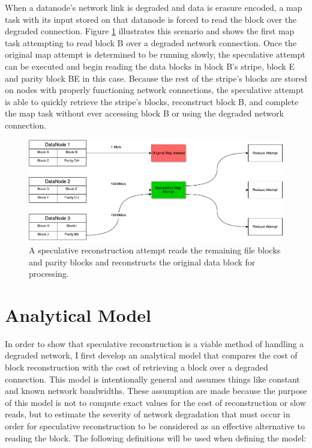 \documentclass{ucetd}
\begin{document}
When a datanode's network link is degraded and data is erasure encoded, a map
task with its input stored on that datanode is forced to read the block over the
degraded connection. Figure \ref{specRecon} illustrates this scenario and shows
the first map task attempting to read block B over a degraded network
connection. Once the original map attempt is determined to be running slowly,
the speculative attempt can be executed and begin reading the data blocks in
block B's stripe, block E and parity block BE in this case. Because the rest of
the stripe's blocks are stored on nodes with properly functioning network
connections, the speculative attempt is able to quickly retrieve the stripe's
blocks, reconstruct block B, and complete the map task without ever accessing
block B or using the degraded network connection.

\begin{figure}
    \centering
    \includegraphics[width=\textwidth]{diagrams/SpeculativeReconstruction.pdf}
    \caption[Speculative Reconstruction]{A speculative reconstruction attempt
        reads the remaining file blocks and parity blocks and reconstructs the
        original data block for processing.}
    \label{specRecon}
\end{figure}

\section{Analytical Model}

In order to show that speculative reconstruction is a viable method of handling
a degraded network, I first develop an analytical model that compares the cost
of block reconstruction with the cost of retrieving a block over a degraded
connection.  This model is intentionally general and assumes things like
constant and known network bandwidths. These assumption are made because the
purpose of this model is not to compute exact values for the cost of
reconstruction or slow reads, but to estimate the severity of network degradation
that must occur in order for speculative reconstruction to be considered as an
effective alternative to reading the block. The following definitions will be
used when defining the model:
\end{document}
